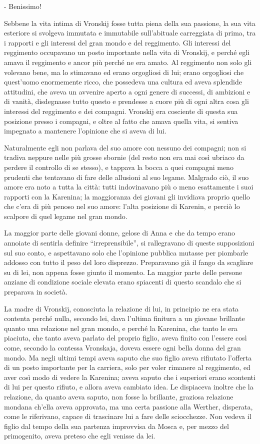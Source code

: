 - Benissimo! 

Sebbene la vita intima di Vronskij fosse tutta piena della sua passione, la sua vita esteriore si svolgeva immutata e immutabile sull'abituale carreggiata di prima, tra i rapporti e gli interessi del gran mondo e del reggimento. Gli interessi del reggimento occupavano un posto importante nella vita di Vronskij, e perché egli amava il reggimento e ancor più perché ne era amato. Al reggimento non solo gli volevano bene, ma lo stimavano ed erano orgogliosi di lui; erano orgogliosi che quest'uomo enormemente ricco, che possedeva una cultura ed aveva splendide attitudini, che aveva un avvenire aperto a ogni genere di successi, di ambizioni e di vanità, disdegnasse tutto questo e prendesse a cuore più di ogni altra cosa gli interessi del reggimento e dei compagni. Vronskij era cosciente di questa sua posizione presso i compagni, e oltre al fatto che amava quella vita, si sentiva impegnato a mantenere l'opinione che si aveva di lui. 

Naturalmente egli non parlava del suo amore con nessuno dei compagni; non si tradiva neppure nelle più grosse sbornie (del resto non era mai così ubriaco da perdere il controllo di se stesso), e tappava la bocca a quei compagni meno prudenti che tentavano di fare delle allusioni al suo legame. Malgrado ciò, il suo amore era noto a tutta la città: tutti indovinavano più o meno esattamente i suoi rapporti con la Karenina; la maggioranza dei giovani gli invidiava proprio quello che c'era di più penoso nel suo amore: l'alta posizione di Karenin, e perciò lo scalpore di quel legame nel gran mondo. 

La maggior parte delle giovani donne, gelose di Anna e che da tempo erano annoiate di sentirla definire ``irreprensibile'', si rallegravano di queste supposizioni sul suo conto, e aspettavano solo che l'opinione pubblica mutasse per piombarle addosso con tutto il peso del loro disprezzo. Preparavano già il fango da scagliare su di lei, non appena fosse giunto il momento. La maggior parte delle persone anziane di condizione sociale elevata erano spiacenti di questo scandalo che si preparava in società. 

La madre di Vronskij, conosciuta la relazione di lui, in principio ne era stata contenta perché nulla, secondo lei, dava l'ultima finitura a un giovane brillante quanto una relazione nel gran mondo, e perché la Karenina, che tanto le era piaciuta, che tanto aveva parlato del proprio figlio, aveva finito con l'essere così come, secondo la contessa Vronskaja, doveva essere ogni bella donna del gran mondo. Ma negli ultimi tempi aveva saputo che suo figlio aveva rifiutato l'offerta di un posto importante per la carriera, solo per voler rimanere al reggimento, ed aver così modo di vedere la Karenina; aveva saputo che i superiori erano scontenti di lui per questo rifiuto, e allora aveva cambiato idea. Le dispiaceva inoltre che la relazione, da quanto aveva saputo, non fosse la brillante, graziosa relazione mondana ch'ella aveva approvata, ma una certa passione alla Werther, disperata, come le riferivano, capace di trascinare lui a fare delle sciocchezze. Non vedeva il figlio dal tempo della sua partenza improvvisa da Mosca e, per mezzo del primogenito, aveva preteso che egli venisse da lei. 

